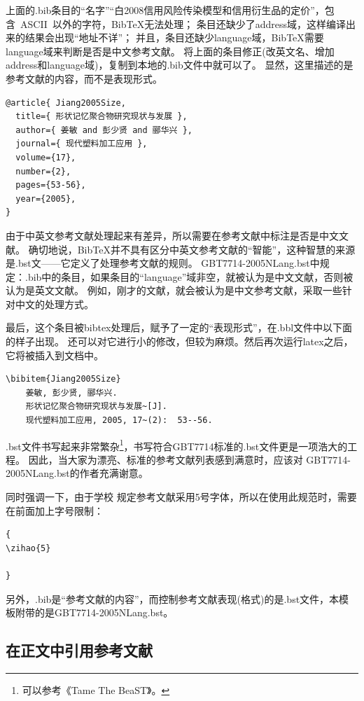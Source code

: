   上面的.bib条目的``名字''\cndash{}``白2008信用风险传染模型和信用衍生品的定价''，包含~ASCII~以外的字符，BibTeX无法处理；
  条目还缺少了address域，这样编译出来的结果会出现``地址不详''；
  并且，条目还缺少language域，BibTeX需要language域来判断是否是中文参考文献。
  将上面的条目修正(改英文名、增加address和language域)，复制到本地的.bib文件中就可以了。
  显然，这里描述的是参考文献的内容，而不是表现形式。

  \begin{lstlisting}[caption={一个符合规范的.bib条目}, label=itemok, float, escapeinside="", numbers=none]
@article{ Jiang2005Size,
  title={ 形状记忆聚合物研究现状与发展 },
  author={ 姜敏 and 彭少贤 and 郦华兴 },
  journal={ 现代塑料加工应用 },
  volume={17},
  number={2},
  pages={53-56},
  year={2005},
}
  \end{lstlisting}

由于中英文参考文献处理起来有差异，所以需要在参考文献中标注是否是中文文献。
确切地说，BibTeX并不具有区分中英文参考文献的``智能''，这种智慧的来源是.bst文——它定义了处理参考文献的规则。
GBT7714-2005NLang.bst中规定：.bib中的条目，如果条目的``language''域非空，就被认为是中文文献，否则被认为是英文文献。
例如，刚才的文献，就会被认为是中文参考文献，采取一些针对中文的处理方式。

最后，这个条目被bibtex处理后，赋予了一定的``表现形式''，在.bbl文件中以下面的样子出现。
还可以对它进行小的修改，但较为麻烦。然后再次运行latex之后，它将被插入到文档中。

\begin{lstlisting}[caption={.bbl中被格式化之后的条目}, escapeinside="", numbers=none]
\bibitem{Jiang2005Size}
	姜敏, 彭少贤, 郦华兴.
	形状记忆聚合物研究现状与发展~[J].
	现代塑料加工应用, 2005, 17~(2):  53--56.
\end{lstlisting}

.bst文件书写起来非常繁杂\footnote{可以参考《Tame The BeaST》。}，书写符合GBT7714标准的.bst文件更是一项浩大的工程。
因此，当大家为漂亮、标准的参考文献列表感到满意时，应该对
GBT7714-2005NLang.bst的作者充满谢意。{\color{red} 同时强调一下，由于学校
  规定参考文献采用5号字体，所以在使用此规范时，需要在前面加上字号限制：
\begin{lstlisting}
{
\zihao{5}

}
\end{lstlisting}}

另外，.bib是“参考文献的内容”，而控制参考文献表现(格式)的是.bst文件，本模板附带的是GBT7714-2005NLang.bst。

\subsection{在正文中引用参考文献}


